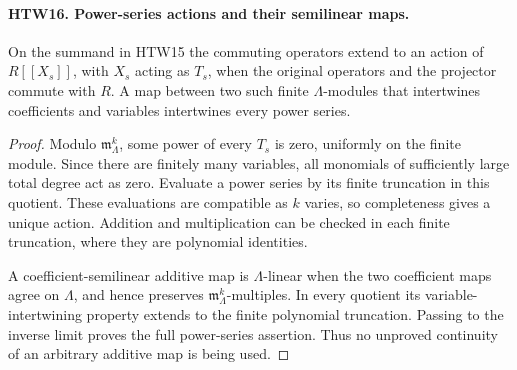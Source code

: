 \paragraph{HTW16. Power-series actions and their semilinear maps.}
\label{claim:HTW16}
On the summand in HTW15 the commuting operators extend
to an action of \(R[[X_s]]\), with \(X_s\) acting as \(T_s\),
when the original operators and the projector commute
with \(R\).  A map between two such finite
\(\Lambda\)-modules that intertwines coefficients and
variables intertwines every power series.
\begin{proof}
Modulo \(\mathfrak m_\Lambda^k\), some power of every
\(T_s\) is zero, uniformly on the finite module.
Since there are finitely many variables, all monomials
of sufficiently large total degree act as zero.
Evaluate a power series by its finite truncation in
this quotient.  These evaluations are compatible as
\(k\) varies, so completeness gives a unique action.
Addition and multiplication can be checked in each
finite truncation, where they are polynomial identities.

A coefficient-semilinear additive map is
\(\Lambda\)-linear when the two coefficient maps agree
on \(\Lambda\), and hence preserves
\(\mathfrak m_\Lambda^k\)-multiples.  In every quotient
its variable-intertwining property extends to the
finite polynomial truncation.  Passing to the inverse
limit proves the full power-series assertion.
Thus no unproved continuity of an arbitrary additive
map is being used.
\end{proof}


